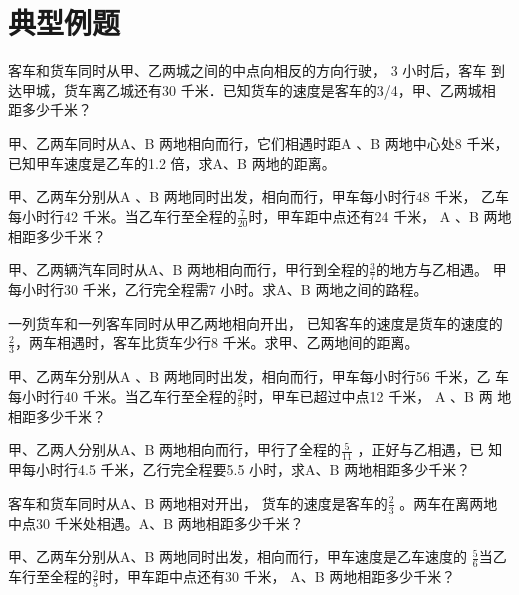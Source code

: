 \section{典型例题}
\begin{example}
    客车和货车同时从甲、乙两城之间的中点向相反的方向行驶， 3 小时后，客车
到达甲城，货车离乙城还有30 千米．已知货车的速度是客车的3/4，甲、乙两城相
距多少千米？
\end{example}
\vspace{2.5cm}
\begin{example}
    甲、乙两车同时从A、B 两地相向而行，它们相遇时距A 、B 两地中心处8
千米，已知甲车速度是乙车的1.2 倍，求A、B 两地的距离。
\end{example}
\vspace{2.5cm}
\begin{example}
    甲、乙两车分别从A 、B 两地同时出发，相向而行，甲车每小时行48 千米，
乙车每小时行42 千米。当乙车行至全程的$\frac{7}{20}$时，甲车距中点还有24 千米， A 、B
两地相距多少千米？
\end{example}
\vspace{2.5cm}
\begin{example}
    甲、乙两辆汽车同时从A、B 两地相向而行，甲行到全程的$\frac{3}{7}$的地方与乙相遇。
甲每小时行30 千米，乙行完全程需7 小时。求A、B 两地之间的路程。
\end{example}
\vspace{2.5cm}
\begin{example}
    一列货车和一列客车同时从甲乙两地相向开出， 已知客车的速度是货车的速度的
$\frac{2}{3}$，两车相遇时，客车比货车少行8 千米。求甲、乙两地间的距离。
\end{example}
\vspace{2.5cm}
\begin{example}
    甲、乙两车分别从A 、B 两地同时出发，相向而行，甲车每小时行56 千米，乙
车每小时行40 千米。当乙车行至全程的$\frac{2}{5}$时，甲车已超过中点12 千米， A 、B 两
地相距多少千米？
\end{example}
\vspace{2.5cm}
\begin{example}
    甲、乙两人分别从A、B 两地相向而行，甲行了全程的$\frac{5}{11}$ ，正好与乙相遇，已
    知甲每小时行4.5 千米，乙行完全程要5.5 小时，求A、B 两地相距多少千米？
\end{example}
\vspace{2.5cm}
\begin{example}
    客车和货车同时从A、B 两地相对开出， 货车的速度是客车的$\frac{2}{3}$ 。两车在离两地
中点30 千米处相遇。A、B 两地相距多少千米？
\end{example}
\vspace{2.5cm}
\begin{example}
    甲、乙两车分别从A、B 两地同时出发，相向而行，甲车速度是乙车速度的
$\frac{5}{6}$当乙车行至全程的$\frac{2}{5}$时，甲车距中点还有30 千米， A、B 两地相距多少千米？
\end{example}
\vspace{2.5cm}